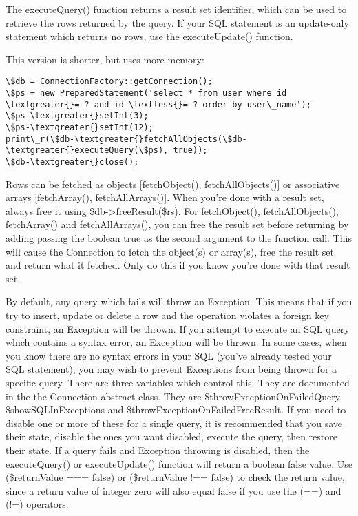 \documentclass[letterpaper,10pt,english]{sphinxmanual}
\begin{document}
The executeQuery() function returns a result set identifier, which can be used to retrieve the rows
returned by the query.  If your SQL statement is an update-only statement which returns no rows, use
the executeUpdate() function.

This version is shorter, but uses more memory:

\begin{Verbatim}[commandchars=\\\{\}]
\$db = ConnectionFactory::getConnection();
\$ps = new PreparedStatement('select * from user where id \textgreater{}= ? and id \textless{}= ? order by user\_name');
\$ps-\textgreater{}setInt(3);
\$ps-\textgreater{}setInt(12);
print\_r(\$db-\textgreater{}fetchAllObjects(\$db-\textgreater{}executeQuery(\$ps), true));
\$db-\textgreater{}close();
\end{Verbatim}

Rows can be fetched as objects {[}fetchObject(), fetchAllObjects(){]} or associative arrays
{[}fetchArray(), fetchAllArrays(){]}.  When you're done with a result set, always free it using
\$db-\textgreater{}freeResult(\$rs).  For fetchObject(), fetchAllObjects(), fetchArray() and fetchAllArrays(), you
can free the result set before returning by adding passing the boolean true as the second argument
to the function call.  This will cause the Connection to fetch the object(s) or array(s), free the
result set and return what it fetched.  Only do this if you know you're done with that result set.

By default, any query which fails will throw an Exception.  This means that if you try to insert,
update or delete a row and the operation violates a foreign key constraint, an Exception will be
thrown.  If you attempt to execute an SQL query which contains a syntax error, an Exception will be
thrown.  In some cases, when you know there are no syntax errors in your SQL (you've already tested
your SQL statement), you may wish to prevent Exceptions from being thrown for a specific query.
There are three variables which control this.  They are documented in the the Connection abstract
class.  They are \$throwExceptionOnFailedQuery, \$showSQLInExceptions and
\$throwExceptionOnFailedFreeResult.  If you need to disable one or more of these for a single query,
it is recommended that you save their state, disable the ones you want disabled, execute the query,
then restore their state.  If a query fails and Exception throwing is disabled, then the
executeQuery() or executeUpdate() function will return a boolean false value.  Use (\$returnValue ===
false) or (\$returnValue !== false) to check the return value, since a return value of integer zero
will also equal false if you use the (==) and (!=) operators.
\end{document}
